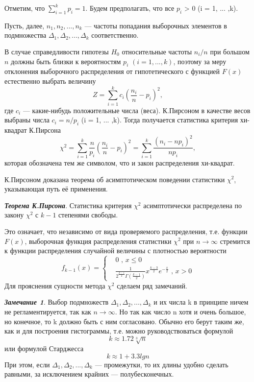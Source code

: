 \documentclass[a4paper]{article}
\begin{document}
Отметим, что $\sum_{i=1}^{k}{p_{i}} = 1$.
Будем предполагать, что все $p_{i}$ > 0 (i = 1, ... ,k).

Пусть, далее, $n_{1},n_{2}, ... ,n_{k}$ — частоты попадания выборочных элементов в подмножества $\Delta_{1},\Delta_{2}, ... ,\Delta_{k}$ соответственно.

В случае справедливости гипотезы $H_{0}$ относительные частоты $n_{i}/n$ при большом $n$ должны быть близки к вероятностям $p_{i}$ $(i = 1, ... ,k)$, поэтому за меру отклонения выборочного распределения от гипотетического с функцией $F(x)$ естественно выбрать величину
$$
Z = \sum_{i = 1}^{k}{c_{i}(\frac{n_{i}}{n} - p_{i})^{2}}, 
\label{Z}
$$
где $c_{i}$ — какие-нибудь положительные числа (веса). К.Пирсоном в качестве весов выбраны числа $c_{i} = n/p_{i}$ (i = 1, ... ,k). Тогда получается статистика критерия хи-квадрат К.Пирсона
\begin{equation}
\chi^{2} = \sum_{i = 1}^{k}{\frac{n}{p_{i}}(\frac{n_{i}}{n} - p_{i})^{2}} = \sum_{i = 1}^{k}{\frac{(n_{i} - np_{i})^{2}}{np_{i}}}, 
\label{chi_2}
\end{equation}
которая обозначена тем же символом, что и закон распределения хи-квадрат.

К.Пирсоном доказана теорема об асимптотическом поведении статистики $\chi^{2}$, указывающая путь её применения.

\textbf{\textit{Теорема К.Пирсона}}. Статистика критерия $\chi^{2}$ асимптотически распределена по закону $\chi^{2}$ с $k-1$ степенями свободы.

Это означает, что независимо от вида проверяемого распределения, т.е. функции $F(x)$, выборочная функция распределения статистики $\chi^{2}$ при $n \rightarrow \infty$  стремится к функции распределения случайной величины с плотностью вероятности 
$$
f_{k - 1}(x) = 
\begin{cases}
& 0 \text{ , } x  \leq 0  \\ 
& \frac{1}{2^{\frac{k-1}{2}}\Gamma(\frac{k-1}{2})}x^{\frac{k-3}{2}}e^{-\frac{x}{2}}
\text{ , } x>0 
\end{cases}
\label{f_k-1}
$$
Для прояснения сущности метода $\chi^{2}$ сделаем ряд замечаний.

\textbf{\textit{Замечание 1}}. Выбор подмножеств $\Delta_{1},\Delta_{2}, ... ,\Delta_{k}$ и их числа k в принципе ничем не регламентируется, так как $n \rightarrow \infty$. Но так как число n хотя и очень большое, но конечное, то k должно быть с ним согласовано. Обычно его берут таким же, как и для построения гистограммы, т.е. можно руководствоваться формулой
$$
k \approx 1.72\sqrt[3]{n}
\label{k_1}
$$
или формулой Старджесса
$$
k \approx 1 + 3.3lgn
$$
При этом, если  $\Delta_{1},\Delta_{2}, ... ,\Delta_{k}$ — промежутки, то их длины удобно сделать равными, за исключением крайних — полубесконечных.
\end{document}
